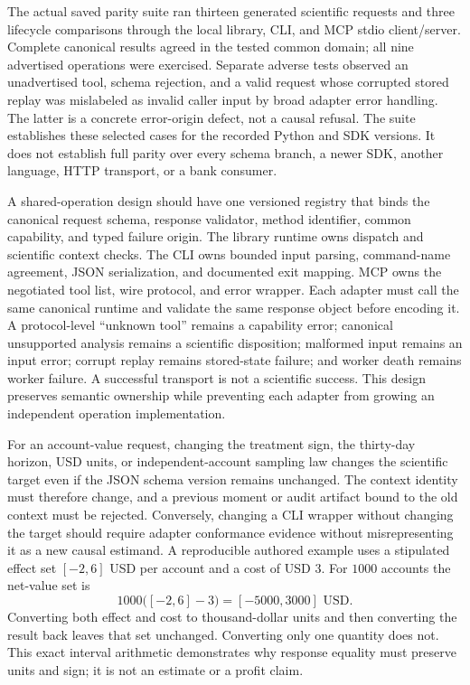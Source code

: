 The actual saved parity suite ran thirteen generated scientific requests and
three lifecycle comparisons through the local library, CLI, and MCP stdio
client/server. Complete canonical results agreed in the tested common domain;
all nine advertised operations were exercised. Separate adverse tests observed
an unadvertised tool, schema rejection, and a valid request whose corrupted
stored replay was mislabeled as invalid caller input by broad adapter error
handling. The latter is a concrete error-origin defect, not a causal refusal.
The suite establishes these selected cases for the recorded Python and SDK
versions. It does not establish full parity over every schema branch, a newer
SDK, another language, HTTP transport, or a bank consumer.
\citep{exec16_parity_observed}

A shared-operation design should have one versioned registry that binds the
canonical request schema, response validator, method identifier, common
capability, and typed failure origin. The library runtime owns dispatch and
scientific context checks. The CLI owns bounded input parsing, command-name
agreement, JSON serialization, and documented exit mapping. MCP owns the
negotiated tool list, wire protocol, and error wrapper. Each adapter must call
the same canonical runtime and validate the same response object before
encoding it. A protocol-level “unknown tool” remains a capability error;
canonical unsupported analysis remains a scientific disposition; malformed
input remains an input error; corrupt replay remains stored-state failure;
and worker death remains worker failure. A successful transport is not a
scientific success. This design preserves semantic ownership while preventing
each adapter from growing an independent operation implementation.
\citep{exec16_parity_design,exec14_failure_design}

For an account-value request, changing the treatment sign, the thirty-day
horizon, USD units, or independent-account sampling law changes the scientific
target even if the JSON schema version remains unchanged. The context identity
must therefore change, and a previous moment or audit artifact bound to the
old context must be rejected. Conversely, changing a CLI wrapper without
changing the target should require adapter conformance evidence without
misrepresenting it as a new causal estimand. A reproducible authored example
uses a stipulated effect set $[-2,6]$ USD per account and a cost of USD $3$.
For $1000$ accounts the net-value set is
\[
 1000\bigl([-2,6]-3\bigr)=[-5000,3000]\text{ USD}.
\]
Converting both effect and cost to thousand-dollar units and then converting
the result back leaves that set unchanged. Converting only one quantity does
not. This exact interval arithmetic demonstrates why response equality must
preserve units and sign; it is not an estimate or a profit claim.
\citep{exec17_continuity_reference}


